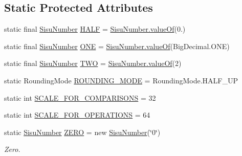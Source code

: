 \subsection*{Static Protected Attributes}
\begin{DoxyCompactItemize}
\item 
static final \hyperlink{classcom_1_1aarrelaakso_1_1drawl_1_1_sisu_number}{Sisu\+Number} \hyperlink{classcom_1_1aarrelaakso_1_1drawl_1_1_sisu_number_afae3e6d652b8c125dccab3e110d038b0}{H\+A\+LF} = \hyperlink{classcom_1_1aarrelaakso_1_1drawl_1_1_sisu_number_aa78b92a5f2ed2f598c6ba0775cbc2587}{Sisu\+Number.\+value\+Of}(0.)
\item 
static final \hyperlink{classcom_1_1aarrelaakso_1_1drawl_1_1_sisu_number}{Sisu\+Number} \hyperlink{classcom_1_1aarrelaakso_1_1drawl_1_1_sisu_number_ad74e537df980406b3282861605df259c}{O\+NE} = \hyperlink{classcom_1_1aarrelaakso_1_1drawl_1_1_sisu_number_aa78b92a5f2ed2f598c6ba0775cbc2587}{Sisu\+Number.\+value\+Of}(Big\+Decimal.\+O\+NE)
\item 
static final \hyperlink{classcom_1_1aarrelaakso_1_1drawl_1_1_sisu_number}{Sisu\+Number} \hyperlink{classcom_1_1aarrelaakso_1_1drawl_1_1_sisu_number_a699eb6b7e4648b4a8d888890b32e26f9}{T\+WO} = \hyperlink{classcom_1_1aarrelaakso_1_1drawl_1_1_sisu_number_aa78b92a5f2ed2f598c6ba0775cbc2587}{Sisu\+Number.\+value\+Of}(2)
\item 
static Rounding\+Mode \hyperlink{classcom_1_1aarrelaakso_1_1drawl_1_1_sisu_number_a98077c422e928740febf571e3f2ec6b5}{R\+O\+U\+N\+D\+I\+N\+G\+\_\+\+M\+O\+DE} = Rounding\+Mode.\+H\+A\+L\+F\+\_\+\+UP
\item 
static int \hyperlink{classcom_1_1aarrelaakso_1_1drawl_1_1_sisu_number_a9355f25a360283c24625dbdf2a397a0c}{S\+C\+A\+L\+E\+\_\+\+F\+O\+R\+\_\+\+C\+O\+M\+P\+A\+R\+I\+S\+O\+NS} = 32
\item 
static int \hyperlink{classcom_1_1aarrelaakso_1_1drawl_1_1_sisu_number_ac514e84eda80c3673b5006716984670a}{S\+C\+A\+L\+E\+\_\+\+F\+O\+R\+\_\+\+O\+P\+E\+R\+A\+T\+I\+O\+NS} = 64
\item 
static \hyperlink{classcom_1_1aarrelaakso_1_1drawl_1_1_sisu_number}{Sisu\+Number} \hyperlink{classcom_1_1aarrelaakso_1_1drawl_1_1_sisu_number_ae9e547c1510ee19d5cc6401c828f1003}{Z\+E\+RO} = new \hyperlink{classcom_1_1aarrelaakso_1_1drawl_1_1_sisu_number}{Sisu\+Number}(\char`\"{}0\char`\"{})
\begin{DoxyCompactList}\small\item\em Zero. \end{DoxyCompactList}\item 

\end{DoxyCompactItemize}
